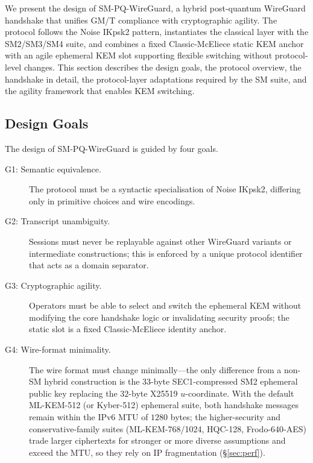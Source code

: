 \documentclass{SCIS2026}
\begin{document}
We present the design of SM-PQ-WireGuard, a hybrid post-quantum
WireGuard handshake that unifies GM/T compliance with cryptographic
agility.  The protocol follows the Noise \textsf{IKpsk2} pattern,
instantiates the classical layer with the SM2/SM3/SM4 suite, and
combines a fixed Classic-McEliece static KEM anchor with an agile
ephemeral KEM slot supporting flexible switching without protocol-level
changes.  This section describes the design goals, the protocol
overview, the handshake in detail, the protocol-layer adaptations
required by the SM suite, and the agility framework that enables KEM
switching.

\subsection{Design Goals}
\label{sec:goals}

The design of SM-PQ-WireGuard is guided by four goals.

\begin{description}
\item[G1: Semantic equivalence.] The protocol must be a syntactic
specialisation of Noise \textsf{IKpsk2}, differing only in primitive
choices and wire encodings.

\item[G2: Transcript unambiguity.] Sessions must never be replayable
against other WireGuard variants or intermediate constructions; this
is enforced by a unique protocol identifier that acts as a domain
separator.

\item[G3: Cryptographic agility.] Operators must be able to select
and switch the ephemeral KEM without modifying the core handshake logic
or invalidating security proofs; the static slot is a fixed
Classic-McEliece identity anchor.

\item[G4: Wire-format minimality.] The wire format must change
minimally---the only difference from a non-SM hybrid construction is
the $33$-byte SEC1-compressed SM2 ephemeral public key replacing the
$32$-byte X25519 $u$-coordinate.  With the default ML-KEM-512 (or
Kyber-512) ephemeral suite, both handshake messages remain within the
IPv6 MTU of $1280$ bytes; the higher-security and conservative-family
suites (ML-KEM-768/1024, HQC-128, Frodo-640-AES) trade larger
ciphertexts for stronger or more diverse assumptions and exceed the
MTU, so they rely on IP fragmentation (\S\ref{sec:perf}).
\end{description}
\end{document}
